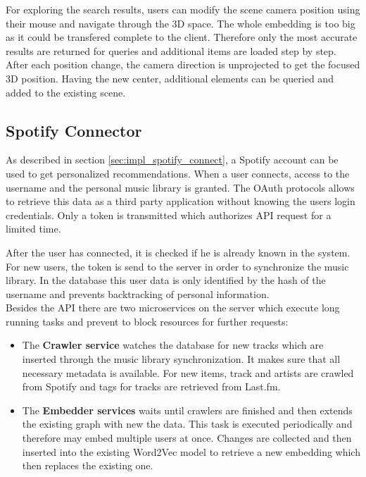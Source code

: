 \documentclass[sigconf]{acmart}
\begin{document}
For exploring the search results, users can modify the scene camera position using their mouse and navigate through the 3D space. The whole embedding is too big as it could be transfered complete to the client. Therefore only the most accurate results are returned for queries and additional items are loaded step by step. After each position change, the camera direction is unprojected to get the focused 3D position. Having the new center, additional elements can be queried and added to the existing scene.

\subsection{Spotify Connector}
As described in section \ref{sec:impl_spotify_connect}, a Spotify account can be used to get personalized recommendations. When a user connects, access to the username and the personal music library is granted. The OAuth protocols allows to retrieve this data as a third party application without knowing the users login credentials. Only a token is transmitted which authorizes API request for a limited time.

After the user has connected, it is checked if he is already known in the system. For new users, the token is send to the server in order to synchronize the music library. In the database this user data is only identified by the hash of the username and prevents backtracking of personal information.\\

Besides the API there are two microservices on the server which execute long running tasks and prevent to block resources for further requests:
\begin{itemize}
	\item The \textbf{Crawler service} watches the database for new tracks which are inserted through the music library synchronization. It makes sure that all necessary metadata is available. For new items, track and artists are crawled from Spotify and tags for tracks are retrieved from Last.fm.
	\item The \textbf{Embedder services} waits until crawlers are finished and then extends the existing graph with new the data. This task is executed periodically and therefore may embed multiple users at once. Changes are collected and then inserted into the existing Word2Vec model to retrieve a new embedding which then replaces the existing one.
\end{itemize}
\end{document}
